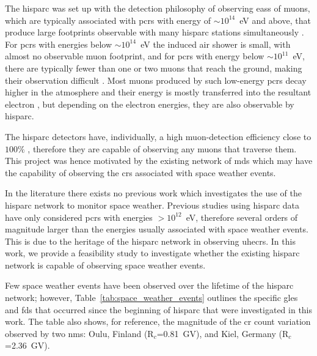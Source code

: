 The \gls{hisparc} was set up with the detection philosophy of observing \glspl{eas} of muons, which are typically associated with \glspl{pcr} with energy of $\sim10^{14}$~eV and above, that produce large footprints observable with many \gls{hisparc} stations simultaneously \citep{fokkema_hisparc_2012, bartels_hisparc_2012}. For \glspl{pcr} with energies below $\sim10^{14}$~eV the induced air shower is small, with almost no observable muon footprint, and for \glspl{pcr} with energy below $\sim10^{11}$~eV, there are typically fewer than one or two muons that reach the ground, making their observation difficult \citep{van_dam_hisparc_2020}. Most muons produced by such low-energy \glspl{pcr} decay higher in the atmosphere and their energy is mostly transferred into the resultant electron \citep{van_dam_hisparc_2020}, but depending on the electron energies, they are also observable by \gls{hisparc}.

The \gls{hisparc} detectors have, individually, a high muon-detection
efficiency close to $100\%$ \citep{van_dam_hisparc_2020}, therefore they are capable of observing any muons that traverse them. This project was hence motivated by the existing network of \glspl{md} which may have the capability of observing the \glspl{cr} associated with space weather events.

In the literature there exists no previous work which investigates the use of the \gls{hisparc} network to monitor space weather. Previous studies using \gls{hisparc} data have only considered \glspl{pcr} with energies $> 10^{12}$~eV, therefore several orders of magnitude larger than the energies usually associated with space weather events. This is due to the heritage of the \gls{hisparc} network in observing \glspl{uhecr}. In this work, we provide a feasibility study to investigate whether the existing \gls{hisparc} network is capable of observing space weather events. 

Few space weather events have been observed over the lifetime of the \gls{hisparc} network; however, Table~\ref{tab:space_weather_events} outlines the specific \glspl{gle} and \glspl{fd} that occurred since the beginning of \gls{hisparc} that were investigated in this work. The table also shows, for reference, the magnitude of the \gls{cr} count variation observed by two \glspl{nm}: Oulu, Finland (R$_c$=0.81~GV), and Kiel, Germany (R$_c$=2.36~GV).

